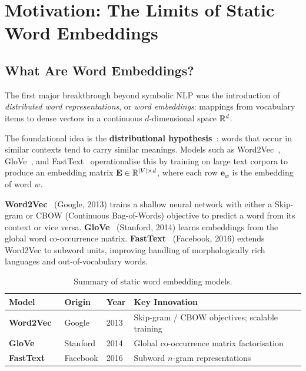 \section{Motivation: The Limits of Static Word Embeddings}
\label{sec:static}

\subsection{What Are Word Embeddings?}

The first major breakthrough beyond symbolic NLP was the introduction of
\emph{distributed word representations}, or \emph{word embeddings}: mappings
from vocabulary items to dense vectors in a continuous $d$-dimensional space
$\mathbb{R}^d$.

The foundational idea is the \textbf{distributional hypothesis}~\cite{harris1954distributional}:
words that occur in similar contexts tend to carry similar meanings. Models such
as Word2Vec~\cite{mikolov2013word2vec}, GloVe~\cite{pennington2014glove}, and
FastText~\cite{bojanowski2017fasttext} operationalise this by training on large
text corpora to produce an embedding matrix $\mathbf{E} \in \mathbb{R}^{|V| \times d}$,
where each row $\mathbf{e}_w$ is the embedding of word $w$.

\textbf{Word2Vec}~\cite{mikolov2013word2vec} (Google, 2013) trains a shallow
neural network with either a Skip-gram or CBOW (Continuous Bag-of-Words)
objective to predict a word from its context or vice versa.
\textbf{GloVe}~\cite{pennington2014glove} (Stanford, 2014) learns embeddings
from the global word co-occurrence matrix.
\textbf{FastText}~\cite{bojanowski2017fasttext} (Facebook, 2016) extends
Word2Vec to subword units, improving handling of morphologically rich languages
and out-of-vocabulary words.

\begin{table}[H]
\centering
\caption{Summary of static word embedding models.}
\label{tab:static}
\begin{tabularx}{0.92\textwidth}{>{\bfseries}lllX}
  \toprule
  Model & Origin & Year & Key Innovation \\
  \midrule
  Word2Vec~\cite{mikolov2013word2vec}    & Google   & 2013
    & Skip-gram / CBOW objectives; scalable training \\
  GloVe~\cite{pennington2014glove}       & Stanford & 2014
    & Global co-occurrence matrix factorisation \\
  FastText~\cite{bojanowski2017fasttext} & Facebook & 2016
    & Subword $n$-gram representations \\
  \bottomrule
\end{tabularx}
\end{table}

